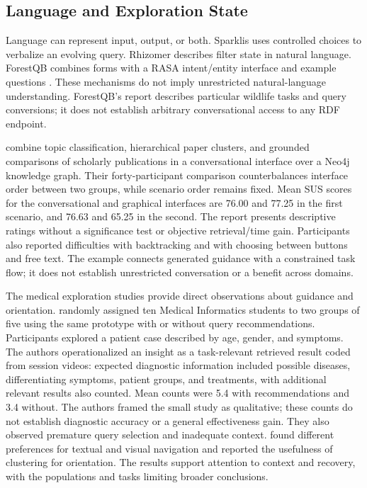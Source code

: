 \documentclass[manuscript,review,screen]{acmart}
\begin{document}
\subsection{Language and Exploration State}
Language can represent input, output, or both. Sparklis uses controlled choices to verbalize an evolving query. Rhizomer describes filter state in natural language. ForestQB combines forms with a RASA intent/entity interface and example questions \citep{2017_Ferre_Sparklis_An,V3-01105,V3-01155}. These mechanisms do not imply unrestricted natural-language understanding. ForestQB's report describes particular wildlife tasks and query conversions; it does not establish arbitrary conversational access to any RDF endpoint.

\citet{V3-00696} combine topic classification, hierarchical paper clusters, and grounded comparisons of scholarly publications in a conversational interface over a Neo4j knowledge graph. Their forty-participant comparison counterbalances interface order between two groups, while scenario order remains fixed. Mean SUS scores for the conversational and graphical interfaces are 76.00 and 77.25 in the first scenario, and 76.63 and 65.25 in the second. The report presents descriptive ratings without a significance test or objective retrieval/time gain. Participants also reported difficulties with backtracking and with choosing between buttons and free text. The example connects generated guidance with a constrained task flow; it does not establish unrestricted conversation or a benefit across domains.

The medical exploration studies provide direct observations about guidance and orientation. \citet{2021_Witschel_Natural_Language-based} randomly assigned ten Medical Informatics students to two groups of five using the same prototype with or without query recommendations. Participants explored a patient case described by age, gender, and symptoms. The authors operationalized an insight as a task-relevant retrieved result coded from session videos: expected diagnostic information included possible diseases, differentiating symptoms, patient groups, and treatments, with additional relevant results also counted. Mean counts were 5.4 with recommendations and 3.4 without. The authors framed the small study as qualitative; these counts do not establish diagnostic accuracy or a general effectiveness gain. They also observed premature query selection and inadequate context. \citet{2022_Grether_Studying_Interaction} found different preferences for textual and visual navigation and reported the usefulness of clustering for orientation. The results support attention to context and recovery, with the populations and tasks limiting broader conclusions.
\end{document}
